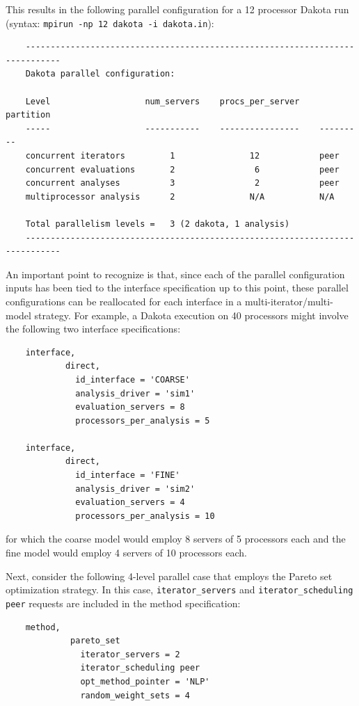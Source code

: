 This results in the following parallel configuration for a 12
processor Dakota run \\
(syntax: \texttt{mpirun -np 12 dakota -i dakota.in}):
\begin{small}
\begin{verbatim}
    -----------------------------------------------------------------------------
    Dakota parallel configuration:

    Level                   num_servers    procs_per_server    partition
    -----                   -----------    ----------------    ---------
    concurrent iterators         1               12            peer
    concurrent evaluations       2                6            peer
    concurrent analyses          3                2            peer
    multiprocessor analysis      2               N/A           N/A

    Total parallelism levels =   3 (2 dakota, 1 analysis)
    -----------------------------------------------------------------------------
\end{verbatim}
\end{small}

An important point to recognize is that, since each of the parallel
configuration inputs has been tied to the interface specification up
to this point, these parallel configurations can be reallocated for
each interface in a multi-iterator/multi-model strategy. For example,
a Dakota execution on 40 processors might involve the following two
interface specifications:
\begin{small}
\begin{verbatim}
    interface,
            direct,
              id_interface = 'COARSE'
              analysis_driver = 'sim1'
              evaluation_servers = 8
              processors_per_analysis = 5

    interface,
            direct,
              id_interface = 'FINE'
              analysis_driver = 'sim2'
              evaluation_servers = 4
              processors_per_analysis = 10
\end{verbatim}
\end{small}

for which the coarse model would employ 8 servers of 5 processors each
and the fine model would employ 4 servers of 10 processors each.

Next, consider the following 4-level parallel case that employs the
Pareto set optimization strategy. In this case,
\texttt{iterator\_servers} and \texttt{iterator\_scheduling peer}
requests are included in the method specification:
\begin{small}
\begin{verbatim}
    method,
             pareto_set
               iterator_servers = 2
               iterator_scheduling peer
               opt_method_pointer = 'NLP'
               random_weight_sets = 4
\end{verbatim}
\end{small}

